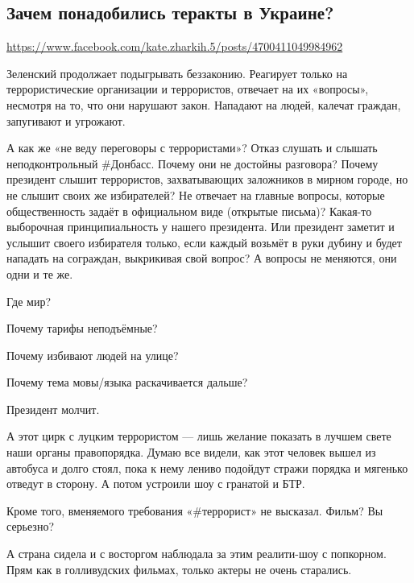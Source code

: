  
 
 
 
 

\subsection{Зачем понадобились теракты в Украине?}
\label{sec:25_07_2020.fb.zharkih_ekaterina.1.terakty}
\url{https://www.facebook.com/kate.zharkih.5/posts/4700411049984962}

Зеленский продолжает подыгрывать беззаконию. Реагирует только на
террористические организации и террористов, отвечает на их «вопросы», несмотря
на то, что они нарушают закон. Нападают на людей, калечат граждан, запугивают и
угрожают.

А как же «не веду переговоры с террористами»?  Отказ слушать и слышать
неподконтрольный #Донбасс. Почему они не достойны разговора? Почему президент
слышит террористов, захватывающих заложников в мирном городе, но не слышит
своих же избирателей? Не отвечает на главные вопросы, которые общественность
задаёт в официальном виде (открытые письма)? Какая-то выборочная
принципиальность у нашего президента. Или президент заметит и услышит своего
избирателя только, если каждый возьмёт в руки дубину и будет нападать на
сограждан, выкрикивая свой вопрос? А вопросы не меняются, они одни и те же.

Где мир?

Почему тарифы неподъёмные?

Почему избивают людей на улице?

Почему тема мовы/языка раскачивается дальше?

Президент молчит.

А этот цирк с луцким террористом — лишь желание показать в лучшем свете наши органы правопорядка. Думаю все видели, как этот человек вышел из автобуса и долго стоял, пока к нему лениво подойдут стражи порядка и мягенько отведут в сторону. А потом устроили шоу с гранатой и БТР.

Кроме того, вменяемого требования «#террорист» не высказал. Фильм? Вы серьезно?

А страна сидела и с восторгом наблюдала за этим реалити-шоу с попкорном. Прям как в голливудских фильмах, только актеры не очень старались.

